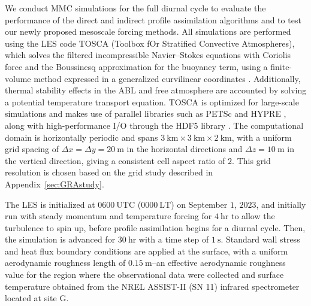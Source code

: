 We conduct MMC simulations for the full diurnal cycle to evaluate the performance of the direct and indirect profile assimilation algorithms and to test our newly proposed mesoscale forcing methods. All simulations are performed using the LES code TOSCA (Toolbox fOr Stratified Convective Atmospheres), which solves the filtered incompressible Navier–Stokes equations with Coriolis force and the Boussinesq approximation for the buoyancy term, using a finite-volume method expressed in a generalized curvilinear coordinates \citep{stipa2023tosca}. Additionally, thermal stability effects in the ABL and free atmosphere are accounted by solving a potential temperature transport equation. TOSCA is optimized for large-scale simulations and makes use of parallel libraries such as PETSc \citep{balay2022petsc} and HYPRE \citep{falgout2002hypre}, along with high-performance I/O through the HDF5 library \citep{HDFGroup2025}. The computational domain is horizontally periodic and spans $3~\mathrm{km} \times 3~\mathrm{km} \times 2~\mathrm{km}$, with a uniform grid spacing of $\Delta x = \Delta y = 20~\mathrm{m}$ in the horizontal directions and $\Delta z = 10~\mathrm{m}$ in the vertical direction, giving a consistent cell aspect ratio of $2$. This grid resolution is chosen based on the grid study described in Appendix~\ref{sec:GRAstudy}.

The LES is initialized at $0600~\mathrm{UTC}$ ($0000~\mathrm{LT}$) on September $1$, $2023$, and initially run with steady momentum and temperature forcing for $4~\mathrm{hr}$ to allow the turbulence to spin up, before profile assimilation begins for a diurnal cycle. Then, the simulation is advanced for $30~\mathrm{hr}$ with a time step of $1~\mathrm{s}$. Standard wall stress and heat flux boundary conditions \citep{schumann1975subgrid, grotzbach1987direct} are applied at the surface, with a uniform aerodynamic roughness length of $0.15~\mathrm{m}$--an effective aerodynamic roughness value for the region where the observational data were collected \citep{cheung2023investigations} and surface temperature obtained from the NREL ASSIST-II (SN 11) infrared spectrometer located at site G.

